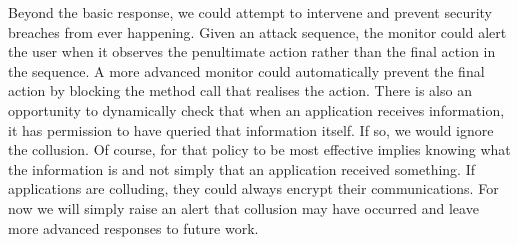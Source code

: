 Beyond the basic response, we could attempt to intervene and prevent security breaches from ever happening.  Given an attack sequence, the monitor could alert the user when it observes the penultimate action rather than the final action in the sequence.  A more advanced monitor could automatically prevent the final action by blocking the method call that realises the action.  There is also an opportunity to dynamically check that when an application receives information, it has permission to have queried that information itself.  If so, we would ignore the collusion.  Of course, for that policy to be most effective implies knowing what the information is and not simply that an application received something.  If applications are colluding, they could always encrypt their communications.  For now we will simply raise an alert that collusion may have occurred and leave more advanced responses to future work.

%
%
%
%
%
%
%
%
%
%
%
%
%
%
%
%